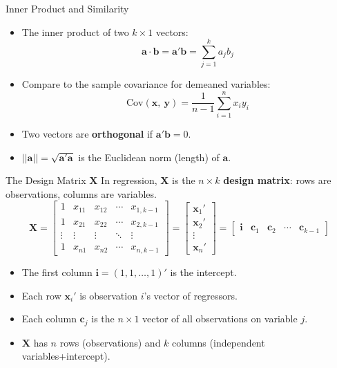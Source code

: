 \documentclass[aspectratio=169, handout, t]{beamer}
\numberwithin{equation}{section}
\begin{document}
\begin{frame}{Inner Product and Similarity}
\begin{itemize}
\item The inner product of two $k\times 1$ vectors:
$$\bm{a}\cdot\bm{b}=\bm{a}'\bm{b}=\sum_{j=1}^k a_jb_j$$\pause
\item Compare to the sample covariance for demeaned variables:
$$\text{Cov}(\bm{x},\ \bm{y})=\frac{1}{n-1}\sum_{i=1}^n x_iy_i$$\pause
\item Two vectors are \textbf{orthogonal} if $\bm{a}'\bm{b}=0$.
\item $||\bm{a}||=\sqrt{\bm{a}'\bm{a}}$ is the Euclidean norm (length) of $\bm{a}$.
\end{itemize}
\end{frame}


\begin{frame}{The Design Matrix $\bm{X}$}
In regression, $\bm{X}$ is the $n\times k$ \textbf{design matrix}: rows are observations, columns are variables.
$$\bm{X}=\begin{bmatrix}
1 & x_{11} & x_{12} & \cdots & x_{1,k-1}\\
1 & x_{21} & x_{22} & \cdots & x_{2,k-1}\\
\vdots & \vdots & \vdots & \ddots & \vdots\\
1 & x_{n1} & x_{n2} & \cdots & x_{n,k-1}
\end{bmatrix}
=\begin{bmatrix} \bm{x}_1' \\ \bm{x}_2' \\ \vdots \\ \bm{x}_n'\end{bmatrix}
=\begin{bmatrix} \bm{i} & \bm{c}_1 & \bm{c}_2 & \cdots & \bm{c}_{k-1}\end{bmatrix}$$\pause
\begin{itemize}
\item The first column $\bm{i}=(1,1,\ldots,1)'$ is the intercept.
\item Each row $\bm{x}_i'$ is observation $i$'s vector of regressors.
\item Each column $\bm{c}_j$ is the $n\times 1$ vector of all observations on variable $j$.
\item $\bm{X}$ has $n$ rows (observations) and $k$ columns (independent variables+intercept).
\end{itemize}
\end{frame}
\end{document}
